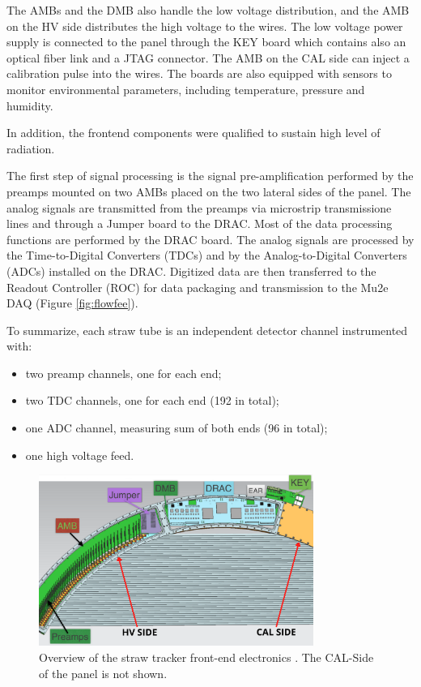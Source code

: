 The AMBs and the DMB also handle the low voltage distribution,
and the AMB on the HV side distributes the high voltage to the wires. 
The low voltage power supply is connected to the panel through the KEY board which 
contains also an optical fiber link and a JTAG connector. The AMB on 
the CAL side can inject a calibration pulse into the wires. 
The boards are also equipped with sensors to monitor environmental parameters, 
including temperature, pressure and humidity.

In addition, the frontend components were qualified to sustain high level of radiation.

The first step of signal processing is the signal pre-amplification performed 
by the preamps mounted on two AMBs placed on the two lateral sides of the panel. 
The analog signals are transmitted from the preamps via 
microstrip transmissione lines and through a Jumper board to the DRAC.
Most of the data processing functions are performed by the DRAC board. 
The analog signals are processed by the Time-to-Digital Converters 
(TDCs) and by the Analog-to-Digital Converters 
(ADCs) installed on the DRAC. Digitized data are then transferred to the Readout 
Controller (ROC) for data packaging and transmission to the Mu2e DAQ 
(Figure \ref{fig:flowfee}). 

To summarize, each straw tube is an independent detector channel instrumented with:
\begin{itemize}
    \item two preamp channels, one for each end;
    \item two TDC channels, one for each end (192 in total);
    \item one ADC channel, measuring sum of both ends (96 in total);
    \item one high voltage feed.

\end{itemize}
\begin{figure}[!h]
\centering
\includegraphics[width =0.8\textwidth]{figures/png/Screenshot_20240131_111836.png}
\caption[Overview of the straw tracker front-end electronics.]{Overview of the straw tracker front-end electronics  
\cite{vadimmu2e}. The CAL-Side of the panel is not shown.}
\label{fig:trackerfee}
\end{figure}


